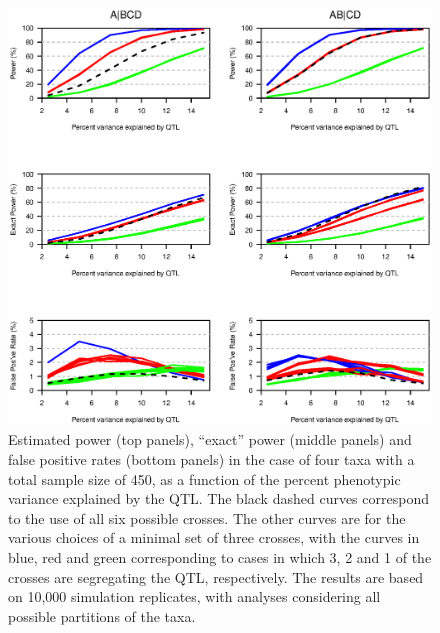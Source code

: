 \documentclass[12pt,letterpaper]{article}
\begin{document}
\newpage
\begin{figure}
\centering
\includegraphics[width=\textwidth]{Figs/fig4.eps}

\vspace{1cm}

\caption{Estimated power (top panels), ``exact'' power (middle panels)
  and false positive rates (bottom panels) in the case of four taxa
  with a total sample size of 450, as a function of the percent
  phenotypic variance explained by the QTL.  The black dashed curves
  correspond to the use of all six possible crosses.  The other curves
  are for the various choices of a minimal set of three crosses, with
  the curves in blue, red and green corresponding to cases in which 3,
  2 and 1 of the crosses are segregating the QTL, respectively.  The
  results are based on 10,000 simulation replicates, with analyses
  considering all possible partitions of the taxa.\label{fig:power}}
\end{figure}
\end{document}
